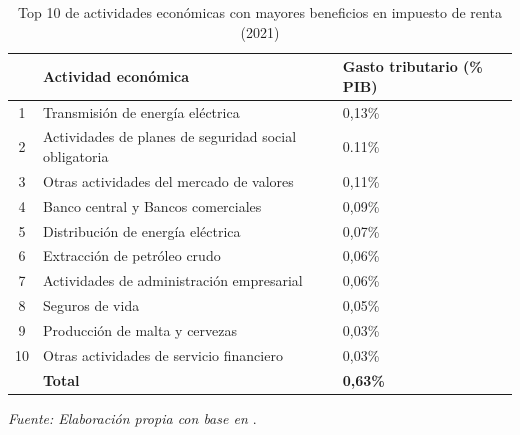 \begin{table}[h]
    \centering
    \caption{Top 10 de actividades económicas con mayores beneficios en impuesto de renta (2021)}
    \label{tab:topact}
    \begin{tabular}{|c|l|p{3.5cm}|} %
        \hline
        \textbf{} & \textbf{Actividad económica} & \textbf{Gasto tributario} (\% PIB) \\
        \hline
        1  & Transmisión de energía eléctrica & 0,13\% \\
        2  & Actividades de planes de seguridad social obligatoria & 0.11\% \\
        3  & Otras actividades del mercado de valores & 0,11\% \\
        4  & Banco central y Bancos comerciales & 0,09\% \\
        5  & Distribución de energía eléctrica & 0,07\% \\
        6  & Extracción de petróleo crudo & 0,06\% \\
        7  & Actividades de administración empresarial & 0,06\% \\
        8  & Seguros de vida & 0,05\% \\
        9  & Producción de malta y cervezas & 0,03\% \\
        10 & Otras actividades de servicio financiero & 0,03\% \\
        \hline
        \textbf{} & \textbf{Total} & \textbf{0,63\%} \\  
        \hline
    \end{tabular}
    \par\footnotesize{\textit{Fuente: Elaboración propia con base en \cite{pardo2024}}.}
\end{table}
